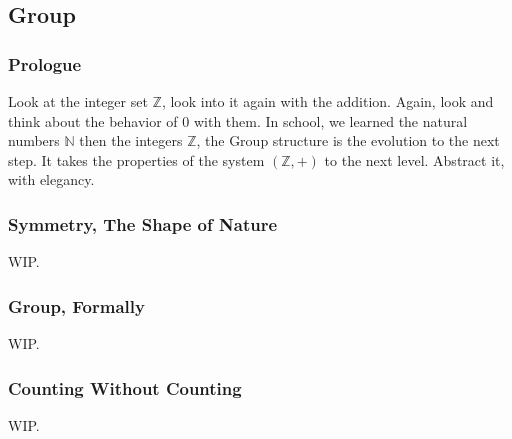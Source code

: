 \subsection{Group \label{group}}
\subsubsection{Prologue}
Look at the integer set $\mathbb{Z}$, look into it again with the addition. Again, look and think about the behavior of $0$ with them. In school, we learned the natural numbers $\mathbb{N}$ then the integers $\mathbb{Z}$, the Group structure is the evolution to the next step. It takes the properties of the system $(\mathbb{Z},+)$ to the next level. Abstract it, with elegancy.

\subsubsection{Symmetry, The Shape of Nature}
WIP.

\subsubsection{Group, Formally}
WIP.


\subsubsection{Counting Without Counting}
WIP.